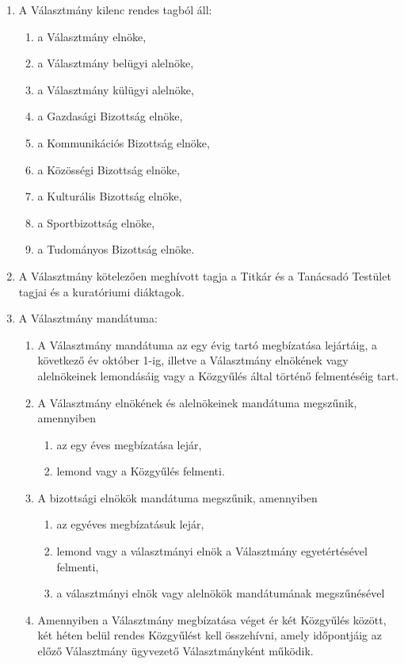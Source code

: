 \documentclass{rulebook}
\begin{document}
\begin{enumerate}
	\item  A Választmány kilenc rendes tagból áll:
	\begin{enumerate}
		\item  a Választmány elnöke,
		\item  a Választmány belügyi alelnöke,
		\item  a Választmány külügyi alelnöke,
		\item  a Gazdasági Bizottság elnöke,
		\item  a Kommunikációs Bizottság elnöke,
		\item  a Közösségi Bizottság elnöke,
		\item  a Kulturális Bizottság elnöke,
		\item  a Sportbizottság elnöke,
		\item  a Tudományos Bizottság elnöke.
	\end{enumerate}
	\item  A Választmány kötelezően meghívott tagja a Titkár és a Tanácsadó Testület tagjai és a kuratóriumi diáktagok.
	\item  A Választmány mandátuma:
	\begin{enumerate}
		\item A Választmány mandátuma az egy évig tartó megbízatása lejártáig, a következő év október 1-ig, illetve a Választmány elnökének vagy alelnökeinek lemondásáig vagy a Közgyűlés által történő felmentéséig tart.
		\item A Választmány elnökének és alelnökeinek mandátuma megszűnik, amennyiben
		\begin{enumerate}
			\item az egy éves megbízatása lejár,
			\item lemond vagy a Közgyűlés felmenti.
		\end{enumerate}
		\item A bizottsági elnökök mandátuma megszűnik, amennyiben
		\begin{enumerate}
			\item az egyéves megbízatásuk lejár,
			\item lemond vagy a választmányi elnök a Választmány egyetértésével felmenti,
			\item a választmányi elnök vagy alelnökök mandátumának megszűnésével
		\end{enumerate}
		\item Amennyiben a Választmány megbízatása véget ér két Közgyűlés között, két héten belül rendes Közgyűlést kell összehívni, amely időpontjáig az előző Választmány ügyvezető Választmányként működik.

\end{enumerate}
\end{enumerate}
\end{document}
